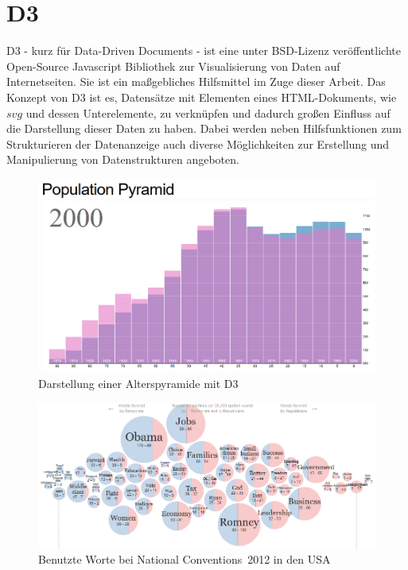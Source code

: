 \section{D3}\label{sec:framework}
D3 - kurz für Data-Driven Documents - ist eine unter BSD-Lizenz veröffentlichte Open-Source Javascript Bibliothek zur Visualisierung von Daten auf Internetseiten. Sie ist ein maßgebliches Hilfsmittel im Zuge dieser Arbeit. Das Konzept von D3 ist es, Datensätze mit Elementen eines HTML-Dokuments, wie $svg$ und dessen Unterelemente, zu verknüpfen und dadurch großen Einfluss auf die Darstellung dieser Daten zu haben. Dabei werden neben Hilfsfunktionen zum Strukturieren der Datenanzeige auch diverse Möglichkeiten zur Erstellung und Manipulierung von Datenstrukturen angeboten. 
\begin{figure}
	\centering
	\includegraphics[width=.8\linewidth]{../screenshots/population_d3.PNG}
	\caption{Darstellung einer Alterspyramide mit D3}
	\label{abb:pyramid}
\end{figure}
\begin{figure}
	\centering
	\includegraphics[width=.8\linewidth]{../screenshots/ny_times_d3.PNG}
	\caption{Benutzte Worte bei \glqq National Conventions\grqq\ 2012 in den USA}
	\label{abb:nytimes}
\end{figure}
